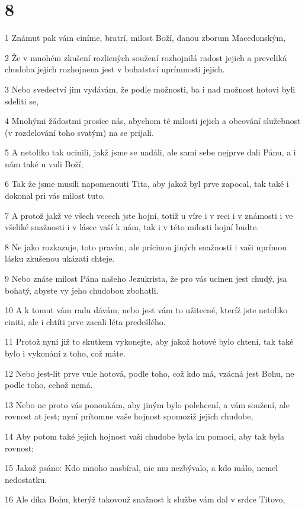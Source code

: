 \chapter{8}

\par 1 Známut pak vám ciníme, bratrí, milost Boží, danou zborum Macedonským,
\par 2 Že v mnohém zkušení rozlicných soužení rozhojnilá radost jejich a preveliká chudoba jejich rozhojnena jest v bohatství uprímnosti jejich.
\par 3 Nebo svedectví jim vydávám, že podle možnosti, ba i nad možnost hotovi byli sdeliti se,
\par 4 Mnohými žádostmi prosíce nás, abychom té milosti jejich a obcování služebnost (v rozdelování toho svatým) na se prijali.
\par 5 A netoliko tak ucinili, jakž jsme se nadáli, ale sami sebe nejprve dali Pánu, a i nám také u vuli Boží,
\par 6 Tak že jsme musili napomenouti Tita, aby jakož byl prve zapocal, tak také i dokonal pri vás milost tuto.
\par 7 A protož jakž ve všech vecech jste hojní, totiž u víre i v reci i v známosti i ve všeliké snažnosti i v lásce vaší k nám, tak i v této milosti hojní budte.
\par 8 Ne jako rozkazuje, toto pravím, ale prícinou jiných snažnosti i vaši uprímou lásku zkušenou ukázati chteje.
\par 9 Nebo znáte milost Pána našeho Jezukrista, že pro vás ucinen jest chudý, jsa bohatý, abyste vy jeho chudobou zbohatli.
\par 10 A k tomut vám radu dávám; nebo jest vám to užitecné, kteríž jste netoliko ciniti, ale i chtíti prve zacali léta predešlého.
\par 11 Protož nyní již to skutkem vykonejte, aby jakož hotové bylo chtení, tak také bylo i vykonání z toho, což máte.
\par 12 Nebo jest-lit prve vule hotová, podle toho, což kdo má, vzácná jest Bohu, ne podle toho, cehož nemá.
\par 13 Nebo ne proto vás ponoukám, aby jiným bylo polehcení, a vám soužení, ale rovnost at jest; nyní prítomne vaše hojnost spomoziž jejich chudobe,
\par 14 Aby potom také jejich hojnost vaší chudobe byla ku pomoci, aby tak byla rovnost;
\par 15 Jakož psáno: Kdo mnoho nasbíral, nic mu nezbývalo, a kdo málo, nemel nedostatku.
\par 16 Ale díka Bohu, kterýž takovouž snažnost k službe vám dal v srdce Titovo,

